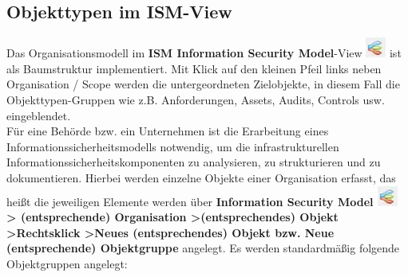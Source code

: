 \documentclass[a4paper,10pt]{book}
\begin{document}
\subsection{Objekttypen im ISM-View}
Das Organisationsmodell im \textbf{ISM Information Security Model}-View \includegraphics[height=2ex]{Icon/Informationssicherheitsmodell.png}
ist als Baumstruktur implementiert.
Mit Klick auf den kleinen Pfeil links neben Organisation / Scope werden die untergeordneten Zielobjekte, in diesem Fall die Objekttypen-Gruppen wie
z.B. Anforderungen, Assets, Audits, Controls usw. eingeblendet.
\newline\\
Für eine Behörde bzw. ein Unternehmen ist die Erarbeitung eines Informationssicherheitsmodells notwendig, um die infrastrukturellen
Informationssicherheitskomponenten zu analysieren, zu strukturieren und zu dokumentieren. Hierbei werden einzelne Objekte einer Organisation erfasst,
das heißt die jeweiligen Elemente werden über \textbf {Information Security Model \includegraphics[height=2ex]{Icon/Informationssicherheitsmodell.png} \textgreater
(entsprechende) Organisation \textgreater (entsprechendes) Objekt \textgreater Rechtsklick \textgreater Neues (entsprechendes)
Objekt bzw. Neue (entsprechende) Objektgruppe} angelegt. Es werden standardmäßig folgende Objektgruppen angelegt:
\end{document}
